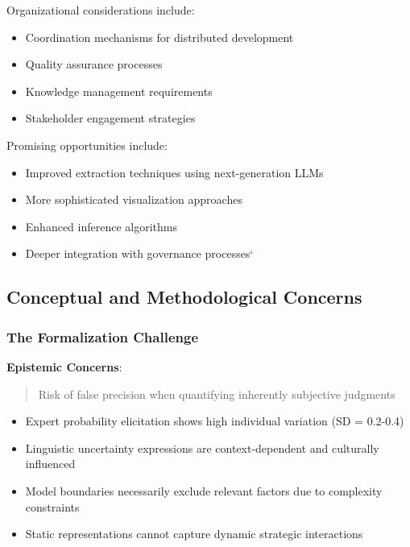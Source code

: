 \documentclass[
  11pt,
  letterpaper,
]{book}
\providecommand{\tightlist}{%
  \setlength{\itemsep}{0pt}\setlength{\parskip}{0pt}}
\begin{document}
Organizational considerations include:

\begin{itemize}
\tightlist
\item
  Coordination mechanisms for distributed development
\item
  Quality assurance processes
\item
  Knowledge management requirements
\item
  Stakeholder engagement strategies
\end{itemize}

Promising opportunities include:

\begin{itemize}
\tightlist
\item
  Improved extraction techniques using next-generation LLMs
\item
  More sophisticated visualization approaches
\item
  Enhanced inference algorithms
\item
  Deeper integration with governance processes`
\end{itemize}

\subsection{Conceptual and Methodological
Concerns}\label{sec-conceptual-concerns2}

\subsubsection{The Formalization
Challenge}\label{sec-formalization-challenge}

\textbf{Epistemic Concerns}:

\begin{quote}
Risk of false precision when quantifying inherently subjective judgments
\end{quote}

\begin{itemize}
\tightlist
\item
  Expert probability elicitation shows high individual variation (SD =
  0.2-0.4)
\item
  Linguistic uncertainty expressions are context-dependent and
  culturally influenced
\item
  Model boundaries necessarily exclude relevant factors due to
  complexity constraints
\item
  Static representations cannot capture dynamic strategic interactions
\end{itemize}
\end{document}
